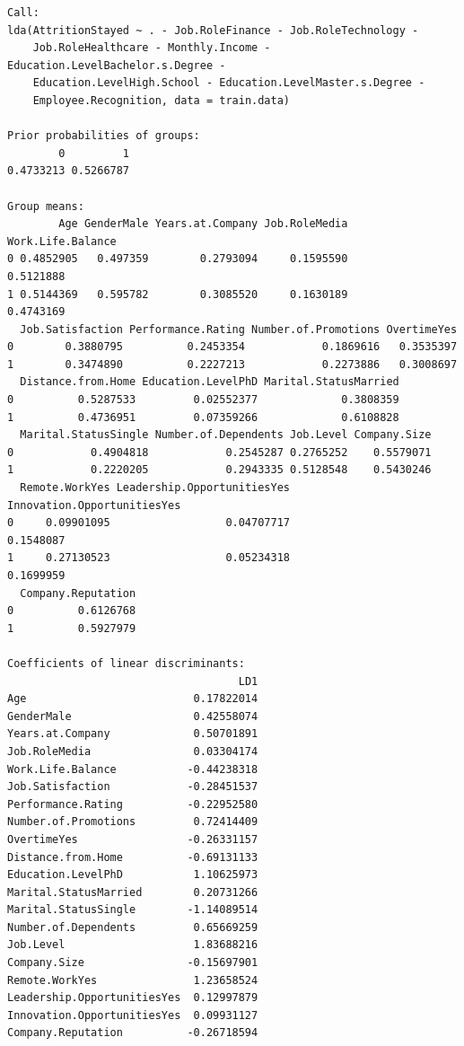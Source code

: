 \documentclass[
  10pt,
  paper=a4,
  ,captions=tableheading
]{scrartcl}
\begin{document}
\begin{verbatim}
Call:
lda(AttritionStayed ~ . - Job.RoleFinance - Job.RoleTechnology - 
    Job.RoleHealthcare - Monthly.Income - Education.LevelBachelor.s.Degree - 
    Education.LevelHigh.School - Education.LevelMaster.s.Degree - 
    Employee.Recognition, data = train.data)

Prior probabilities of groups:
        0         1 
0.4733213 0.5266787 

Group means:
        Age GenderMale Years.at.Company Job.RoleMedia Work.Life.Balance
0 0.4852905   0.497359        0.2793094     0.1595590         0.5121888
1 0.5144369   0.595782        0.3085520     0.1630189         0.4743169
  Job.Satisfaction Performance.Rating Number.of.Promotions OvertimeYes
0        0.3880795          0.2453354            0.1869616   0.3535397
1        0.3474890          0.2227213            0.2273886   0.3008697
  Distance.from.Home Education.LevelPhD Marital.StatusMarried
0          0.5287533         0.02552377             0.3808359
1          0.4736951         0.07359266             0.6108828
  Marital.StatusSingle Number.of.Dependents Job.Level Company.Size
0            0.4904818            0.2545287 0.2765252    0.5579071
1            0.2220205            0.2943335 0.5128548    0.5430246
  Remote.WorkYes Leadership.OpportunitiesYes Innovation.OpportunitiesYes
0     0.09901095                  0.04707717                   0.1548087
1     0.27130523                  0.05234318                   0.1699959
  Company.Reputation
0          0.6126768
1          0.5927979

Coefficients of linear discriminants:
                                    LD1
Age                          0.17822014
GenderMale                   0.42558074
Years.at.Company             0.50701891
Job.RoleMedia                0.03304174
Work.Life.Balance           -0.44238318
Job.Satisfaction            -0.28451537
Performance.Rating          -0.22952580
Number.of.Promotions         0.72414409
OvertimeYes                 -0.26331157
Distance.from.Home          -0.69131133
Education.LevelPhD           1.10625973
Marital.StatusMarried        0.20731266
Marital.StatusSingle        -1.14089514
Number.of.Dependents         0.65669259
Job.Level                    1.83688216
Company.Size                -0.15697901
Remote.WorkYes               1.23658524
Leadership.OpportunitiesYes  0.12997879
Innovation.OpportunitiesYes  0.09931127
Company.Reputation          -0.26718594
\end{verbatim}
\end{document}
